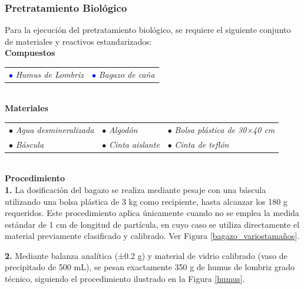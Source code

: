 \documentclass[12pt]{article}
\begin{document}
			\subsubsection{Pretratamiento Biológico}
	
			
		Para la ejecución del pretratamiento biológico, se requiere el siguiente conjunto de materiales y reactivos estandarizados:\\
			
			\textbf{Compuestos} \\[0.5em]
			

				\begin{tabular}{p{0.3\textwidth}p{}}
				\textcolor{blue}{$\bullet$} \textit{Humus de Lombriz}  &	\textcolor{blue}{$\bullet$} \textit{Bagazo de caña}
			\end{tabular} \\[0.5em]
			
			\textbf{Materiales} \\[0.5em] 
	
			\begin{tabular}{p{}p{}p{}}
				$\bullet$ \textit{Agua desmineralizada } & $\bullet$ \textit{Algodón} & $\bullet$ \textit{Bolsa plástica de 30×40 cm }\\
				$\bullet$ \textit{Báscula} & $\bullet$ \textit{Cinta aislante} & $\bullet$ \textit{Cinta de teflón}
			\end{tabular}
			\\[1em]
			
			
			\textbf{Procedimiento}
			\\[0.5em]
			\textbf{1.}	La dosificación del bagazo se realiza mediante pesaje con una báscula utilizando una bolsa plástica de 3 kg como recipiente, hasta alcanzar los 180 g requeridos. Este procedimiento aplica únicamente cuando no se emplea la medida estándar de 1 cm de longitud de partícula, en cuyo caso se utiliza directamente el material previamente clasificado y calibrado. Ver Figura \ref{bagazo_variostamaños}.
		
			
			\textbf{2.}	Mediante balanza analítica (±0.2 g) y material de vidrio calibrado (vaso de precipitado de 500 mL), se pesan exactamente 350 g de humus de lombriz grado técnico, siguiendo el procedimiento ilustrado en la Figura \ref{humus}.
			
\end{document}
